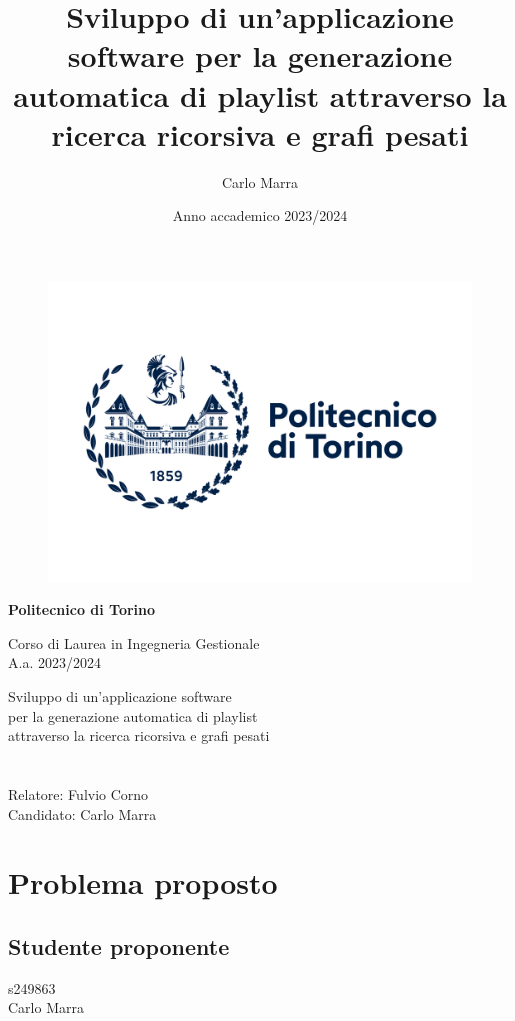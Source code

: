 \documentclass[12pt, a4paper]{article}
\begin{document}
\author{Carlo Marra}
\title{Sviluppo di un'applicazione software per la generazione automatica di playlist attraverso la ricerca ricorsiva e grafi pesati}
\date{Anno accademico 2023/2024}
\begin{figure}[h]
  \centering
  \includegraphics[width=0.7\linewidth]{images/polito_logo_2021_blu}
\end{figure}

\begin{center}
  \LARGE{\textbf{Politecnico di Torino}}
\end{center}
\begin{center}
  \Large{Corso di Laurea in Ingegneria Gestionale\\A.a. 2023/2024}
\end{center}

\begin{center}
  \LARGE{Sviluppo di un'applicazione software\\ per la generazione automatica di playlist\\ attraverso la ricerca ricorsiva e grafi pesati}
\end{center}
\section*{ }
Relatore: Fulvio Corno\\
Candidato: Carlo Marra

\thispagestyle{empty} 
\newpage

\tableofcontents
\thispagestyle{empty} 
\newpage
\setcounter{page}{1}
\section{Problema proposto}

\subsection{Studente proponente}
s249863 \\ Carlo Marra 
\end{document}

